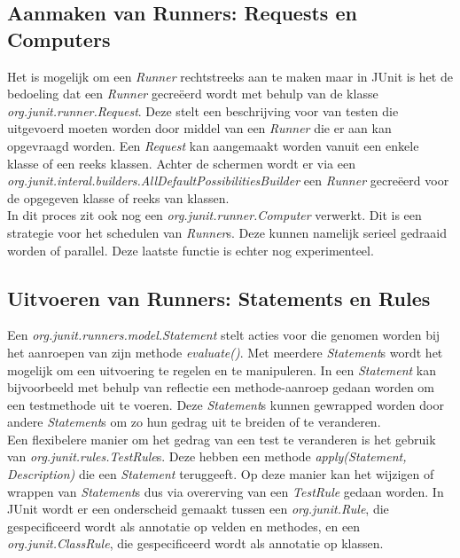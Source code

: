 \documentclass[i1]{oss}
\begin{document}
\subsection{Aanmaken van Runners: Requests en Computers}

Het is mogelijk om een \emph{Runner} rechtstreeks aan te maken maar in JUnit is het de bedoeling dat een \emph{Runner} gecre\"eerd wordt met behulp van de klasse \emph{org.junit.runner.Request}. Deze stelt een beschrijving voor van testen die uitgevoerd moeten worden door middel van een \emph{Runner} die er aan kan opgevraagd worden. Een \emph{Request} kan aangemaakt worden vanuit een enkele klasse of een reeks klassen. Achter de schermen wordt er via een \emph{org.junit.interal.builders.AllDefaultPossibilitiesBuilder} een \emph{Runner} gecre\"eerd voor de opgegeven klasse of reeks van klassen.\\

In dit proces zit ook nog een \emph{org.junit.runner.Computer} verwerkt. Dit is een strategie voor het schedulen van \emph{Runner}s. Deze kunnen namelijk serieel gedraaid worden of parallel. Deze laatste functie is echter nog experimenteel.\\

\subsection{Uitvoeren van Runners: Statements en Rules}

Een \emph{org.junit.runners.model.Statement} stelt acties voor die genomen worden bij het aanroepen van zijn methode \emph{evaluate()}. Met meerdere \emph{Statement}s wordt het mogelijk om een uitvoering te regelen en te manipuleren. In een \emph{Statement} kan bijvoorbeeld met behulp van reflectie een methode-aanroep gedaan worden om een testmethode uit te voeren. Deze \emph{Statement}s kunnen gewrapped worden door andere \emph{Statement}s om zo hun gedrag uit te breiden of te veranderen.\\

Een flexibelere manier om het gedrag van een test te veranderen is het gebruik van \emph{org.junit.rules.TestRule}s. Deze hebben een methode \emph{apply(Statement, Description)} die een \emph{Statement} teruggeeft. Op deze manier kan het wijzigen of wrappen van \emph{Statement}s dus via overerving van een \emph{TestRule} gedaan worden. In JUnit wordt er een onderscheid gemaakt tussen een \emph{org.junit.Rule}, die gespecificeerd wordt als annotatie op velden en methodes, en een \emph{org.junit.ClassRule}, die gespecificeerd wordt als annotatie op klassen.\\
\end{document}
